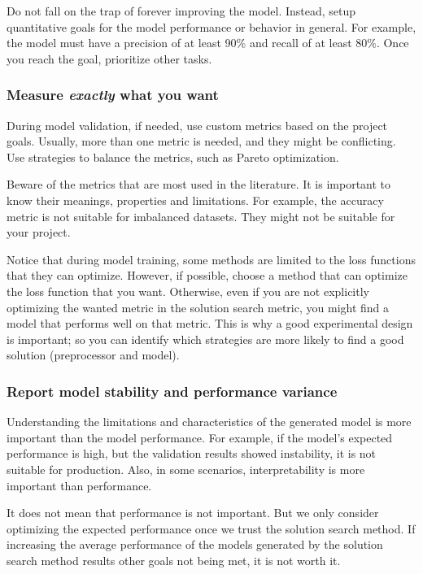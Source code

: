 Do not fall on the trap of forever improving the model. Instead, setup quantitative goals
for the model performance or behavior in general.  For example, the model must have a
precision of at least 90\% and recall of at least 80\%.  Once you reach the goal,
prioritize other tasks.

\subsubsection{Measure \emph{exactly} what you want}

During model validation, if needed, use custom metrics based on the project goals.
Usually, more than one metric is needed, and they might be conflicting.  Use strategies to
balance the metrics, such as Pareto optimization.

Beware of the metrics that are most used in the literature.  It is important to know their
meanings, properties and limitations.  For example, the accuracy metric is not suitable
for imbalanced datasets.  They might not be suitable for your project.

Notice that during model training, some methods are limited to the loss functions that
they can optimize.  However, if possible, choose a method that can optimize the loss
function that you want.  Otherwise, even if you are not explicitly optimizing the wanted
metric in the solution search metric, you might find a model that performs well on that
metric.  This is why a good experimental design is important; so you can identify which
strategies are more likely to find a good solution (preprocessor and model).

\subsubsection{Report model stability and performance variance}

Understanding the limitations and characteristics of the generated model is more important
than the model performance.  For example, if the model's expected performance is high, but
the validation results showed instability, it is not suitable for production.  Also, in
some scenarios, interpretability is more important than performance.

It does not mean that performance is not important.  But we only consider optimizing the
expected performance once we trust the solution search method.  If increasing the average
performance of the models generated by the solution search method results other goals not
being met, it is not worth it.


